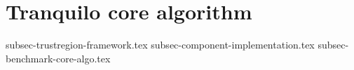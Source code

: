 \section{Tranquilo core algorithm}
\label{sec:tranquilo-core}
{subsec-trustregion-framework.tex}
{subsec-component-implementation.tex}
{subsec-benchmark-core-algo.tex}

